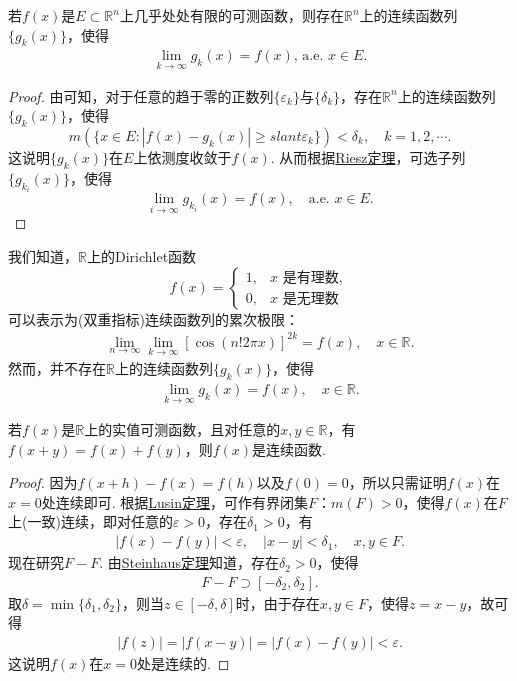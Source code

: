\documentclass[../../main.tex]{subfiles}
\begin{document}
\begin{corollary}\label{corollary:推论3.20}
若\(f(x)\)是\(E \subset \mathbb{R}^{n}\)上几乎处处有限的可测函数，则存在\(\mathbb{R}^{n}\)上的连续函数列\(\{g_{k}(x)\}\)，使得
\begin{align*}
\lim_{k \to \infty} g_{k}(x) = f(x), \,\text{a.e. } x \in E. 
\end{align*}
\end{corollary}
\begin{proof}
由可知，对于任意的趋于零的正数列\(\{\varepsilon_{k}\}\)与\(\{\delta_{k}\}\)，存在\(\mathbb{R}^{n}\)上的连续函数列\(\{g_{k}(x)\}\)，使得
\[m(\{x \in E: |f(x) - g_{k}(x)| \geqslant slant \varepsilon_{k}\}) < \delta_{k}, \quad k = 1,2,\cdots.\]
这说明\(\{g_{k}(x)\}\)在\(E\)上依测度收敛于\(f(x)\). 从而根据\hyperref[theorem:Riesz定理]{Riesz定理}，可选子列\(\{g_{k_{i}}(x)\}\)，使得
\[\lim_{i \to \infty} g_{k_{i}}(x) = f(x), \quad \text{a.e. } x \in E.\] 
\end{proof}
\begin{remark}
我们知道，\(\mathbb{R}\)上的Dirichlet函数
\[f(x)=
\begin{cases}
1, & x\text{ 是有理数},\\
0, & x\text{ 是无理数}
\end{cases}\]
可以表示为(双重指标)连续函数列的累次极限：
\begin{align*}
\lim_{n \to \infty}\lim_{k \to \infty}[\cos(n!2\pi x)]^{2k}=f(x),\quad x\in\mathbb{R}.
\end{align*}
然而，并不存在\(\mathbb{R}\)上的连续函数列\(\{g_{k}(x)\}\)，使得
\begin{align*}
\lim_{k \to \infty}g_{k}(x)=f(x),\quad x\in\mathbb{R}.
\end{align*} 
\end{remark}

\begin{example}
若\(f(x)\)是\(\mathbb{R}\)上的实值可测函数，且对任意的\(x, y \in \mathbb{R}\)，有\(f(x + y) = f(x) + f(y)\)，则\(f(x)\)是连续函数.
\end{example}
\begin{proof}
因为\(f(x + h) - f(x) = f(h)\)以及\(f(0) = 0\)，所以只需证明\(f(x)\)在\(x = 0\)处连续即可. 根据\hyperref[theorem:Lusin(卢津)定理]{Lusin定理}，可作有界闭集\(F\)：\(m(F)>0\)，使得\(f(x)\)在\(F\)上(一致)连续，即对任意的\(\varepsilon > 0\)，存在\(\delta_1 > 0\)，有
\begin{align*}
|f(x) - f(y)| < \varepsilon, \quad |x - y| < \delta_1, \quad x, y \in F.
\end{align*}
现在研究\(F - F\). 由\hyperref[theorem:Steinhaus定理]{Steinhaus定理}知道，存在\(\delta_2 > 0\)，使得
\begin{align*}
F - F \supset [-\delta_2, \delta_2].
\end{align*}
取\(\delta = \min\{\delta_1, \delta_2\}\)，则当\(z \in [-\delta, \delta]\)时，由于存在\(x, y \in F\)，使得\(z = x - y\)，故可得
\begin{align*}
|f(z)| = |f(x - y)| = |f(x) - f(y)| < \varepsilon.
\end{align*}
这说明\(f(x)\)在\(x = 0\)处是连续的.
\end{proof}
\end{document}
